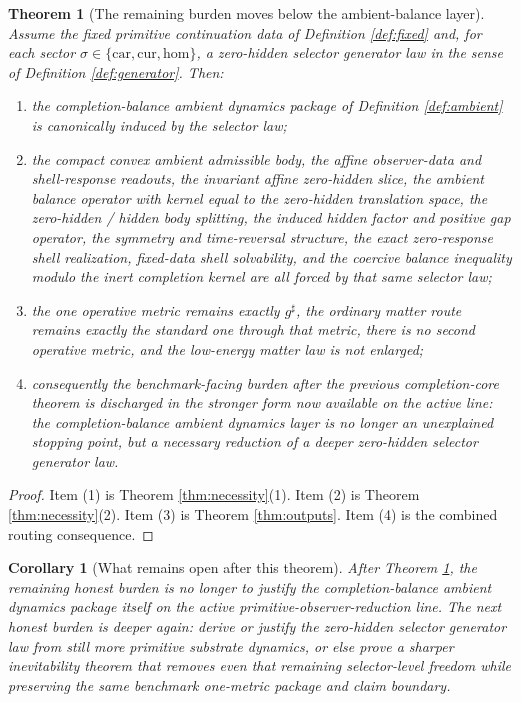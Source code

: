 \documentclass[11pt]{article}
\newcommand{\CompletedMetric}{g^{\sharp}}
\newcommand{\Car}{\mathrm{car}}
\newcommand{\Cur}{\mathrm{cur}}
\newcommand{\Hom}{\mathrm{hom}}
\newtheorem{corollary}{Corollary}
\newtheorem{theorem}{Theorem}
\begin{document}
\begin{theorem}[The remaining burden moves below the ambient-balance layer]
\label{thm:main}
Assume the fixed primitive continuation data of Definition \ref{def:fixed} and, for each sector \(\sigma\in\{\Car,\Cur,\Hom\}\), a zero-hidden selector generator law in the sense of Definition \ref{def:generator}. Then:
\begin{enumerate}
    \item the completion-balance ambient dynamics package of Definition \ref{def:ambient} is canonically induced by the selector law;
    \item the compact convex ambient admissible body, the affine observer-data and shell-response readouts, the invariant affine zero-hidden slice, the ambient balance operator with kernel equal to the zero-hidden translation space, the zero-hidden / hidden body splitting, the induced hidden factor and positive gap operator, the symmetry and time-reversal structure, the exact zero-response shell realization, fixed-data shell solvability, and the coercive balance inequality modulo the inert completion kernel are all forced by that same selector law;
    \item the one operative metric remains exactly \(\CompletedMetric\), the ordinary matter route remains exactly the standard one through that metric, there is no second operative metric, and the low-energy matter law is not enlarged;
    \item consequently the benchmark-facing burden after the previous completion-core theorem is discharged in the stronger form now available on the active line: the completion-balance ambient dynamics layer is no longer an unexplained stopping point, but a necessary reduction of a deeper zero-hidden selector generator law.
\end{enumerate}
\end{theorem}

\begin{proof}
Item (1) is Theorem \ref{thm:necessity}(1). Item (2) is Theorem \ref{thm:necessity}(2). Item (3) is Theorem \ref{thm:outputs}. Item (4) is the combined routing consequence.
\end{proof}

\begin{corollary}[What remains open after this theorem]
\label{cor:next}
After Theorem \ref{thm:main}, the remaining honest burden is no longer to justify the completion-balance ambient dynamics package itself on the active primitive-observer-reduction line. The next honest burden is deeper again: derive or justify the zero-hidden selector generator law from still more primitive substrate dynamics, or else prove a sharper inevitability theorem that removes even that remaining selector-level freedom while preserving the same benchmark one-metric package and claim boundary.
\end{corollary}
\end{document}

